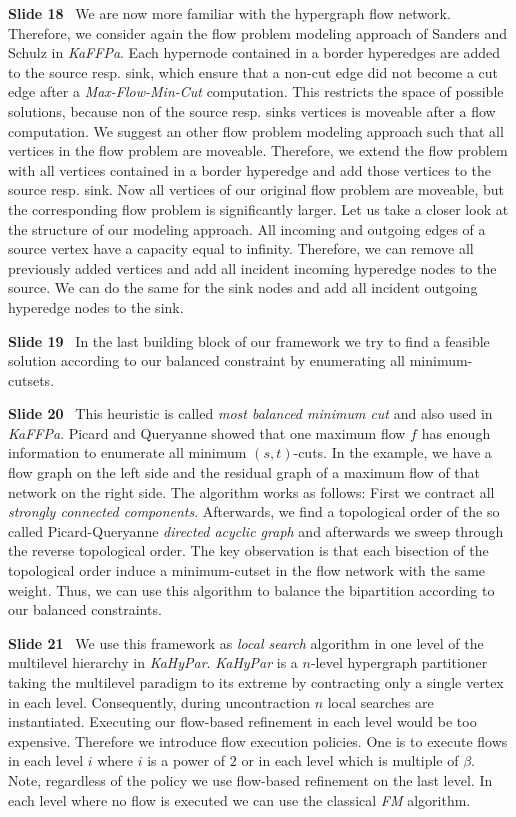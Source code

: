 \documentclass[11pt]{llncs}
\newcommand{\fakepar}[1]{\medskip\par\textbf{#1}\ }
\begin{document}
\fakepar{Slide 18} We are now more familiar with the hypergraph flow network. Therefore, we consider
again the flow problem modeling approach of Sanders and Schulz in \emph{KaFFPa}. Each hypernode
contained in a border hyperedges are added to the source resp. sink, which ensure that a non-cut edge
did not become a cut edge after a \emph{Max-Flow-Min-Cut} computation. This restricts the space of
possible solutions, because non of the source resp. sinks vertices is moveable after a flow 
computation. We suggest an other flow problem modeling approach such that all vertices
in the flow problem are moveable. Therefore, we extend the flow problem with all vertices contained
in a border hyperedge and add those vertices to the source resp. sink. Now all vertices of our original
flow problem are moveable, but the corresponding flow problem is significantly larger. Let us take a
closer look at the structure of our modeling approach. All incoming and outgoing edges of a source vertex
have a capacity equal to infinity. Therefore, we can remove all previously added vertices and add
all incident incoming hyperedge nodes to the source. We can do the same for the sink nodes and
add all incident outgoing hyperedge nodes to the sink.

\fakepar{Slide 19} In the last building block of our framework we try to find a feasible solution
according to our balanced constraint by enumerating all minimum-cutsets.

\fakepar{Slide 20} This heuristic is called \emph{most balanced minimum cut} and also
used in \emph{KaFFPa}. Picard and Queryanne showed that one maximum flow $f$ has enough
information to enumerate all minimum $(s,t)$-cuts. In the example, we have a flow graph
on the left side and the residual graph of a maximum flow of that network on the right side.
The algorithm works as follows: First we contract all \emph{strongly connected components}.
Afterwards, we find a topological order of the so called Picard-Queryanne \emph{directed
acyclic graph} and afterwards we sweep through the reverse topological order. The key
observation is that each bisection of the topological order induce a minimum-cutset in
the flow network with the same weight. Thus, we can use this algorithm to balance the bipartition
according to our balanced constraints.

\fakepar{Slide 21} We use this framework as \emph{local search} algorithm in one level
of the multilevel hierarchy in \emph{KaHyPar}. \emph{KaHyPar} is a $n$-level hypergraph partitioner
taking the multilevel paradigm to its extreme by contracting only a single vertex in each level.
Consequently, during uncontraction $n$ local searches are instantiated. Executing our flow-based
refinement in each level would be too expensive. Therefore we introduce flow execution policies.
One is to execute flows in each level $i$ where $i$ is a power of $2$ or in each level which is
multiple of $\beta$. Note, regardless of the policy we use flow-based refinement on the
last level. In each level where no flow is executed we can use the classical \emph{FM} algorithm.
\end{document}
